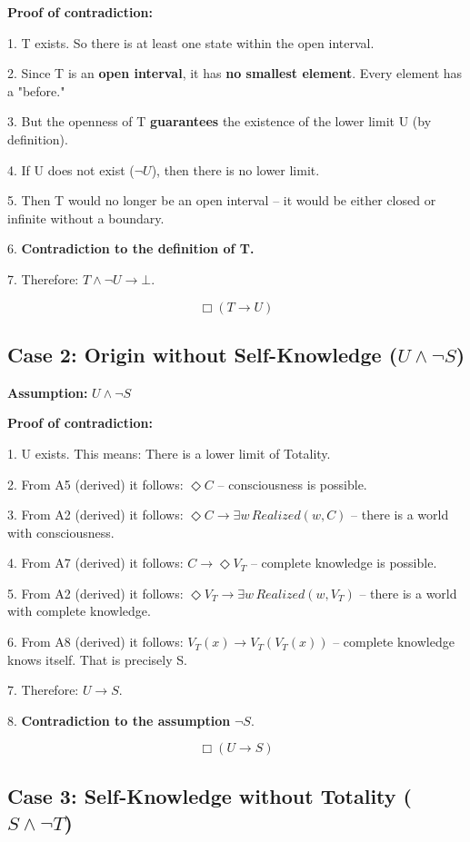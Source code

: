 \documentclass[
]{article}
\begin{document}
\textbf{Proof of contradiction:}

1. T exists. So there is at least one state within the open interval.

2. Since T is an \textbf{open interval}, it has \textbf{no smallest element}. Every element has a "before."

3. But the openness of T \textbf{guarantees} the existence of the lower limit U (by definition).

4. If U does not exist (\(\neg U\)), then there is no lower limit.

5. Then T would no longer be an open interval – it would be either closed or infinite without a boundary.

6. \textbf{Contradiction to the definition of T.}

7. Therefore: \(T \land \neg U \rightarrow \bot\).

\[
\boxed{\Box(T \rightarrow U)}
\]

\subsection{Case 2: Origin without Self-Knowledge (\(U \land \neg S\))}\label{case-2-origin-without-self-knowledge-u-land-neg-s}

\textbf{Assumption:} \(U \land \neg S\)

\textbf{Proof of contradiction:}

1. U exists. This means: There is a lower limit of Totality.

2. From A5 (derived) it follows: \(\Diamond C\) – consciousness is possible.

3. From A2 (derived) it follows: \(\Diamond C \rightarrow \exists w\, Realized(w,C)\) – there is a world with consciousness.

4. From A7 (derived) it follows: \(C \rightarrow \Diamond V_T\) – complete knowledge is possible.

5. From A2 (derived) it follows: \(\Diamond V_T \rightarrow \exists w\, Realized(w,V_T)\) – there is a world with complete knowledge.

6. From A8 (derived) it follows: \(V_T(x) \rightarrow V_T(V_T(x))\) – complete knowledge knows itself. That is precisely S.

7. Therefore: \(U \rightarrow S\).

8. \textbf{Contradiction to the assumption} \(\neg S\).

\[
\boxed{\Box(U \rightarrow S)}
\]

\subsection{Case 3: Self-Knowledge without Totality (\(S \land \neg T\))}\label{case-3-self-knowledge-without-totality-s-land-neg-t}
\end{document}
